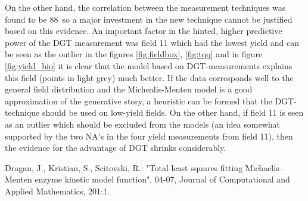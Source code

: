 \documentclass[11pt,fleqn]{article}
\begin{document}
On the other hand, the correlation between the measurement techniques was found to be 88\pro\ so a major investment in the new technique cannot be justified based on this evidence. 
An important factor in the hinted, higher predictive power of the DGT measurement was field 11 which had the lowest yield and can be seen as the outlier in the figures \ref{fig:fieldbox}, \ref{fig:tqq} and in figure \ref{fig:yield_bio} it is clear that the model based on DGT-measurements explains this field (points in light grey) much better. 
If the data corresponds well to the general field distribution and the Michealis-Menten model is a good approximation of the generative story, a heuristic can be formed that the DGT-technique should be used on low-yield fields. 
On the other hand, if field 11 is seen as an outlier which should be excluded from the models (an idea somewhat supported by the two NA's in the four yield measurements from field 11), then the evidence for the advantage of DGT shrinks considerably.

\newpage 
\begin{thebibliography}{9}
	Dragan, J., Kristian, S., Scitovski, R.: "Total least squares fitting Michaelis–Menten enzyme kinetic model function", 04-07, Journal of Computational and Applied Mathematics, 201:1. 

\end{thebibliography}
\end{document}
